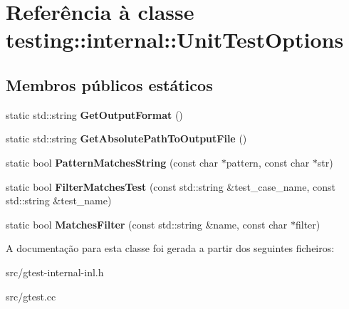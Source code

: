 \hypertarget{classtesting_1_1internal_1_1UnitTestOptions}{\section{Referência à classe testing\-:\-:internal\-:\-:Unit\-Test\-Options}
\label{classtesting_1_1internal_1_1UnitTestOptions}
}
\subsection*{Membros públicos estáticos}
\begin{DoxyCompactItemize}
\item 
\hypertarget{classtesting_1_1internal_1_1UnitTestOptions_ae7413a21296d885c6924650b51ac4f6d}{static std\-::string {\bfseries Get\-Output\-Format} ()}\label{classtesting_1_1internal_1_1UnitTestOptions_ae7413a21296d885c6924650b51ac4f6d}

\item 
\hypertarget{classtesting_1_1internal_1_1UnitTestOptions_a993fb30ad66104158c8c0ac508daca3f}{static std\-::string {\bfseries Get\-Absolute\-Path\-To\-Output\-File} ()}\label{classtesting_1_1internal_1_1UnitTestOptions_a993fb30ad66104158c8c0ac508daca3f}

\item 
\hypertarget{classtesting_1_1internal_1_1UnitTestOptions_af0235a2ee26dd6db21305e11d2358e4f}{static bool {\bfseries Pattern\-Matches\-String} (const char $\ast$pattern, const char $\ast$str)}\label{classtesting_1_1internal_1_1UnitTestOptions_af0235a2ee26dd6db21305e11d2358e4f}

\item 
\hypertarget{classtesting_1_1internal_1_1UnitTestOptions_a9975b59cece94874b303421697e3bca6}{static bool {\bfseries Filter\-Matches\-Test} (const std\-::string \&test\-\_\-case\-\_\-name, const std\-::string \&test\-\_\-name)}\label{classtesting_1_1internal_1_1UnitTestOptions_a9975b59cece94874b303421697e3bca6}

\item 
\hypertarget{classtesting_1_1internal_1_1UnitTestOptions_a67fc0adaffbb8d320b92e42e05017e4e}{static bool {\bfseries Matches\-Filter} (const std\-::string \&name, const char $\ast$filter)}\label{classtesting_1_1internal_1_1UnitTestOptions_a67fc0adaffbb8d320b92e42e05017e4e}

\end{DoxyCompactItemize}


A documentação para esta classe foi gerada a partir dos seguintes ficheiros\-:\begin{DoxyCompactItemize}
\item 
src/gtest-\/internal-\/inl.\-h\item 
src/gtest.\-cc\end{DoxyCompactItemize}
